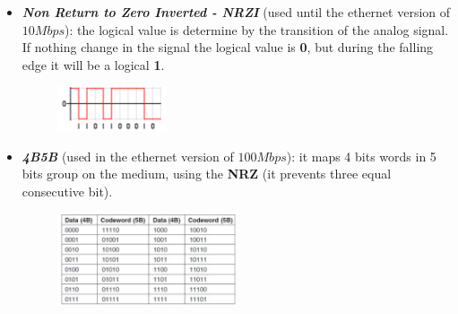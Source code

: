 \begin{itemize}[nosep]
    \item \textbf{\textit{Non Return to Zero Inverted - NRZI}} (used until the ethernet version of $10Mbps$): the logical value is determine by the transition of the analog signal. If nothing change in the signal the logical value is \textbf{0}, but during the falling edge it will be a logical \textbf{1}.
    \begin{figure}[h]
        \centering
        \includegraphics[width=0.3\textwidth]{img/nrzi}
    \end{figure}
    \item \textbf{\textit{4B5B}} (used in the ethernet version of $100Mbps$): it maps 4 bits words in 5 bits group on the medium, using the \textbf{NRZ} (it prevents three equal consecutive bit).
    \begin{figure}[h]
        \centering
        \includegraphics[width=0.5\textwidth]{img/4b5b}
    \end{figure}
\end{itemize}

